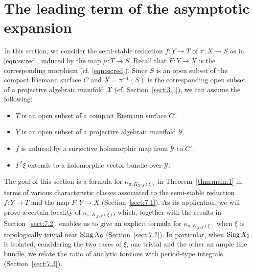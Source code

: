\documentclass[amscd, leqno]{amsart}
\theoremstyle{plain}
\theoremstyle{definition}
\theoremstyle{remark}
\begin{document}
\section
{The leading term of the asymptotic expansion}
\label{sect:7}
\par
In this section, we consider the semi-stable reduction $f \colon Y \to T$ of $\pi \colon X \to S$ as in \eqref{eqn:ss:red}, 
induced by the map $\mu \colon T \to S$. Recall that $F \colon Y \to X$ is the corresponding morphism (cf. \eqref{eqn:ss:red}). 
Since $S$ is an open subset of the compact Riemann surface $C$ and $X = \pi^{-1}(S)$ is the corresponding open subset of 
a projective algebraic manifold ${\mathcal X}$ (cf. Section~\ref{sect:3.1}), we can assume the following: 
\begin{itemize}
\item
$T$ is an open subset of a compact Riemann surface $C'$.
\item
$Y$ is an open subset of a projective algebraic manifold ${\mathcal Y}$. 
\item
$f$ is induced by a surjective holomorphic map from ${\mathcal Y}$ to $C'$. 
\item
$F^{*}\xi$ extends to a holomorphic vector bundle over ${\mathcal Y}$. 
\end{itemize}
The goal of this section is a formula for $\kappa_{\pi,K_{X/S}(\xi)}$ in Theorem~\ref{thm:main:1} 
in terms of various characteristic classes associated to the semi-stable reduction $f \colon Y \to T$ and the map $F \colon Y \to X$
(Section~\ref{sect:7.1}). As its application, we will prove a certain locality of $\kappa_{\pi,K_{X/S}(\xi)}$, which, together with the results in
Section~\ref{sect:7.2}, enables us to give an explicit formula for $\kappa_{\pi,K_{X/S}(\xi)}$ when $\xi$ is topologically trivial 
near ${\rm Sing}\,X_{0}$ (Section~\ref{sect:7.2}). In particular, when ${\rm Sing}\,X_{0}$ is isolated, considering the two cases of $\xi$, 
one trivial and the other an ample line bundle, we relate the ratio of analytic torsions with period-type integrals (Section~\ref{sect:7.3}).



\end{document}
